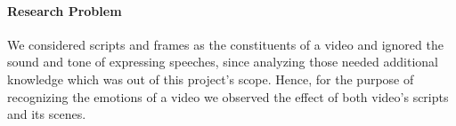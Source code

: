 \paragraph{Research Problem} We considered scripts and frames as the constituents of a video and ignored the sound and tone of expressing speeches, since analyzing those needed additional knowledge which was out of this project's scope. Hence, for the purpose of recognizing the emotions of a video we observed the effect of both video's scripts and its scenes. %




